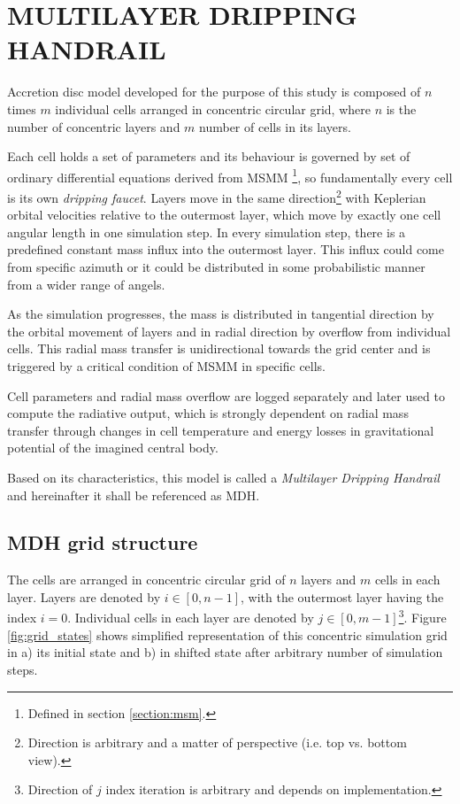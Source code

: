 \chapter{\color{red}MULTILAYER DRIPPING HANDRAIL}
\thispagestyle{empty}


Accretion disc model developed for the purpose of this study is composed of $n$ times $m$ individual cells arranged in concentric circular grid, where $n$ is the number of concentric layers and $m$ number of cells in its layers.

Each cell holds a set of parameters and its behaviour is governed by set of ordinary differential equations derived from MSMM \footnote{Defined in section \ref{section:msm}.}, so fundamentally every cell is its own \emph{dripping faucet}. Layers move in the same direction\footnote{Direction is arbitrary and a matter of perspective (i.e. top vs. bottom view).} with Keplerian orbital velocities relative to the outermost layer, which move by exactly one cell angular length in one simulation step. In every simulation step, there is a predefined constant mass influx into the outermost layer. This influx could come from specific azimuth or it could be distributed in some probabilistic manner from a wider range of angels.

As the simulation progresses, the mass is distributed in tangential direction by the orbital movement of layers and in radial direction by overflow from individual cells. This radial mass transfer is unidirectional towards the grid center and is triggered by a critical condition of MSMM in specific cells. 

Cell parameters and radial mass overflow are logged separately and later used to compute the radiative output, which is strongly dependent on radial mass transfer through changes in cell temperature and energy losses in gravitational potential of the imagined central body. 

Based on its characteristics, this model is called a \emph{Multilayer Dripping Handrail} and hereinafter it shall be referenced as MDH.

\section{MDH grid structure}

The cells are arranged in concentric circular grid of $n$ layers and $m$ cells in each layer. Layers are denoted by $i \in [0, n-1]$, with the outermost layer having the index $i = 0$. Individual cells in each layer are denoted by $j \in [0, m-1]$\footnote{Direction of $j$ index iteration is arbitrary and depends on implementation.}. Figure \ref{fig:grid_states} shows simplified representation of this concentric simulation grid in a) its initial state and b) in shifted state after arbitrary number of simulation steps. 

